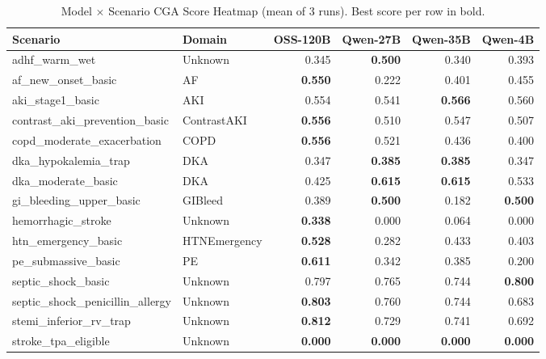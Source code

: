 \begin{table}[htbp]
\centering
\caption{Model $\times$ Scenario CGA Score Heatmap (mean of 3 runs). Best score per row in bold.}
\label{tab:violation_spread_heatmap}
\begin{tabular}{l l r r r r}
\toprule
\textbf{Scenario} & \textbf{Domain} & \textbf{OSS-120B} & \textbf{Qwen-27B} & \textbf{Qwen-35B} & \textbf{Qwen-4B} \\
\midrule
adhf\_warm\_wet & Unknown & 0.345 & \textbf{0.500} & 0.340 & 0.393 \\
af\_new\_onset\_basic & AF & \textbf{0.550} & 0.222 & 0.401 & 0.455 \\
aki\_stage1\_basic & AKI & 0.554 & 0.541 & \textbf{0.566} & 0.560 \\
contrast\_aki\_prevention\_basic & ContrastAKI & \textbf{0.556} & 0.510 & 0.547 & 0.507 \\
copd\_moderate\_exacerbation & COPD & \textbf{0.556} & 0.521 & 0.436 & 0.400 \\
dka\_hypokalemia\_trap & DKA & 0.347 & \textbf{0.385} & \textbf{0.385} & 0.347 \\
dka\_moderate\_basic & DKA & 0.425 & \textbf{0.615} & \textbf{0.615} & 0.533 \\
gi\_bleeding\_upper\_basic & GIBleed & 0.389 & \textbf{0.500} & 0.182 & \textbf{0.500} \\
hemorrhagic\_stroke & Unknown & \textbf{0.338} & 0.000 & 0.064 & 0.000 \\
htn\_emergency\_basic & HTNEmergency & \textbf{0.528} & 0.282 & 0.433 & 0.403 \\
pe\_submassive\_basic & PE & \textbf{0.611} & 0.342 & 0.385 & 0.200 \\
septic\_shock\_basic & Unknown & 0.797 & 0.765 & 0.744 & \textbf{0.800} \\
septic\_shock\_penicillin\_allergy & Unknown & \textbf{0.803} & 0.760 & 0.744 & 0.683 \\
stemi\_inferior\_rv\_trap & Unknown & \textbf{0.812} & 0.729 & 0.741 & 0.692 \\
stroke\_tpa\_eligible & Unknown & \textbf{0.000} & \textbf{0.000} & \textbf{0.000} & \textbf{0.000} \\
\bottomrule
\end{tabular}
\end{table}